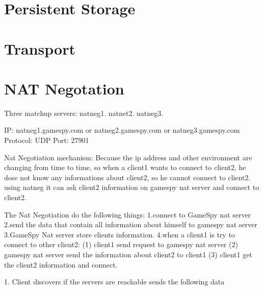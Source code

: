 \documentclass[oneside,titlepage,a4paper]{Definition/retrospy} %
\begin{document}
\part{Persistent Storage}
\part{Transport}
\part{NAT Negotation}
Three matchup servers: natneg1. natnet2. natneg3.

IP: natneg1.gamespy.com or natneg2.gamespy.com or natneg3.gamespy.com
Protocol: UDP
Port: 27901

Nat Negotiation mechanism:
Because the ip address and other environment are changing from time to time, so when a client1 wants to connect
to client2, he dose not know any informations about client2, so he cannot connect to client2. using natneg it can ask client2 information on gamespy nat server and connect to client2.

The Nat Negotiation do the following things:
1.connect to GameSpy nat server
2.send the data that contain all information about himself to gamespy nat server
3.GameSpy Nat server store clients information.
4.when a client1 is try to connect to other client2:
(1) client1 send request to gamespy nat server
(2) gamespy nat server send the information about client2 to client1
(3) client1 get the client2 information and connect.

1. Client discovers if the servers are reachable
sends the following data
\end{document}
